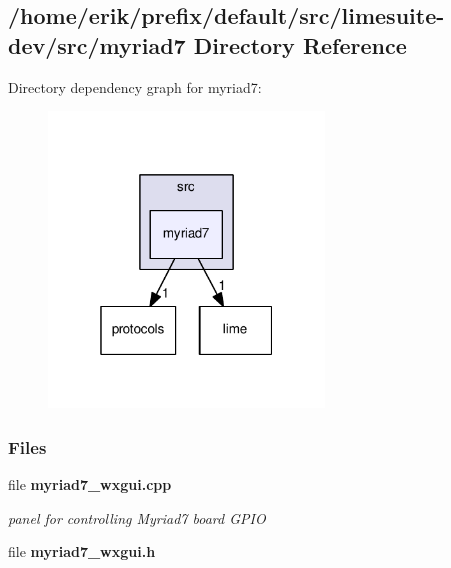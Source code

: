 \subsection{/home/erik/prefix/default/src/limesuite-\/dev/src/myriad7 Directory Reference}
\label{dir_23b7296ec901fd51716419d8a627e11e}
Directory dependency graph for myriad7\+:
\nopagebreak
\begin{figure}[H]
\begin{center}
\leavevmode
\includegraphics[width=208pt]{dir_23b7296ec901fd51716419d8a627e11e_dep}
\end{center}
\end{figure}
\subsubsection*{Files}
\begin{DoxyCompactItemize}
\item 
file {\bf myriad7\+\_\+wxgui.\+cpp}
\begin{DoxyCompactList}\small\item\em panel for controlling Myriad7 board G\+P\+IO \end{DoxyCompactList}\item 
file {\bf myriad7\+\_\+wxgui.\+h}
\end{DoxyCompactItemize}
